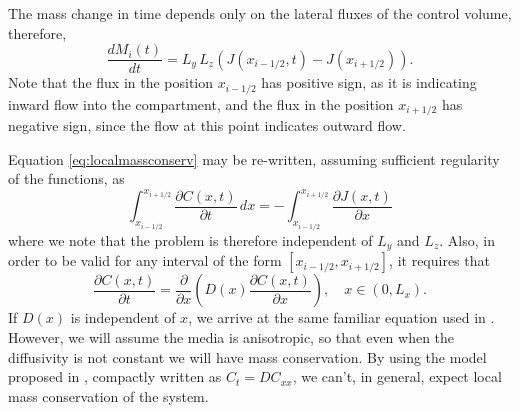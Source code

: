 \documentclass[final,1p,times]{elsarticle}
\begin{document}
The mass change in time depends only on the lateral fluxes of the control volume, therefore,
\begin{equation}
\frac{d M_{i}(t)}{dt}= L_y\, L_z (J(x_{i-1/2}, t)-J(x_{i+1/2})).
\label{eq:localmassconserv}
\end{equation}
Note that the flux in the position $x_{i-1/2}$ has positive sign, as it is indicating inward flow into the compartment, and the flux in the position $x_{i+1/2}$ has negative sign, since the flow at this point indicates outward flow.


Equation \eqref{eq:localmassconserv} may be re-written, assuming sufficient regularity of the functions, as
\begin{equation}
\int_{x_{i-1/2}}^{x_{i+1/2}} \frac{\partial C(x,t) }{\partial t}  \,dx =  -\int_{x_{i-1/2}}^{x_{i+1/2}}\frac{\partial J(x,t)}{\partial x} 
\end{equation}
where we note that the problem is therefore independent of $L_y$ and $L_z$. Also,  in order to be valid for any interval of the form $[x_{i-1/2}, x_{i+1/2}]$, it requires that
\begin{equation}
\frac{\partial C(x,t) }{\partial t}=\frac{\partial  }{\partial x}
\left(D(x) \frac{\partial C(x,t)}{\partial x}\right), \quad x\in (0, L_x).
\label{eq:dif_model}
\end{equation}
If $D(x)$ is independent of $x$, we arrive at the same familiar equation used in \citet{zhang1993headspace}. However, we will assume the media is anisotropic, so that even when the diffusivity is not constant we will have mass conservation. By using the model proposed in \citet{zhang1993headspace}, compactly written as $C_t=DC_{xx}$, we can't, in general, expect local mass conservation of the system. 
\end{document}
